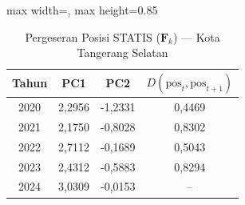 \begin{table}[H]
\centering
\caption{Pergeseran Posisi STATIS ($\mathbf{F}_k$) --- Kota Tangerang Selatan} \label{tab:app2jarak_statis_skor_kota_tangerang_selatan}
\begin{adjustbox}{max width=\textwidth, max height=0.85\textheight}
\begin{tabular}{|c|c|c|c|}
\hline
\textbf{Tahun} & \textbf{PC1} & \textbf{PC2} & \textbf{$D(\text{pos}_t, \text{pos}_{t+1})$} \\
\hline
2020 & 2,2956 & -1,2331 & 0,4469 \\
2021 & 2,1750 & -0,8028 & 0,8302 \\
2022 & 2,7112 & -0,1689 & 0,5043 \\
2023 & 2,4312 & -0,5883 & 0,8294 \\
2024 & 3,0309 & -0,0153 & -- \\
\hline
\end{tabular}
\end{adjustbox}
\end{table}